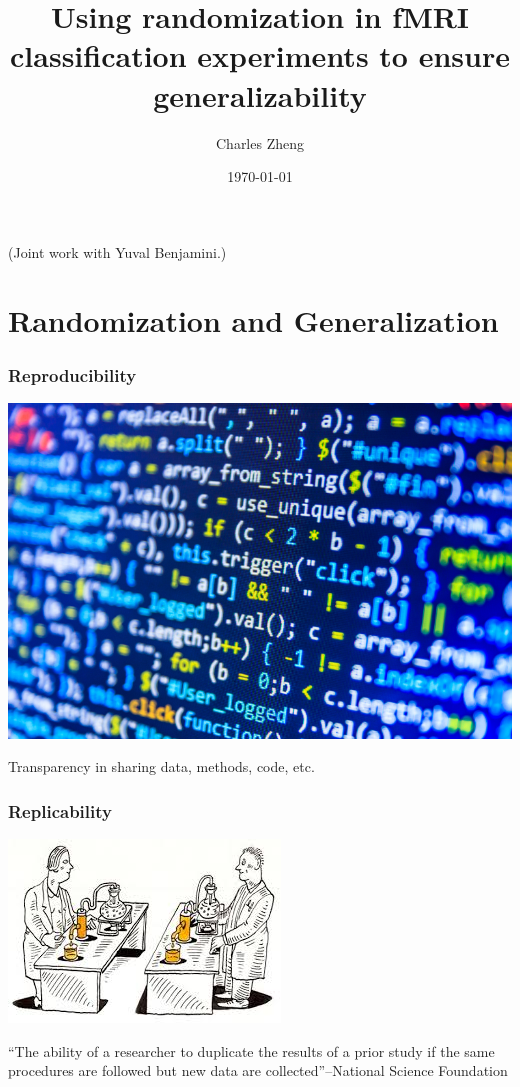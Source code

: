 \documentclass{beamer}
\title[tfMRI generalizability]{Using randomization in fMRI classification experiments to ensure generalizability}
\author{Charles Zheng} %
\institute[Stanford] %
{Stanford University}
\date{\today} %
\begin{document}
\begin{frame}
\titlepage %
(Joint work with Yuval Benjamini.)
\end{frame}

\section{Randomization and Generalization}

\begin{frame}
\frametitle{Reproducibility}
\begin{center}
\includegraphics[scale = 0.8]{code_clipart.jpg}
\end{center}
Transparency in sharing data, methods, code, etc.
\end{frame}

\begin{frame}
\frametitle{Replicability}
\begin{center}
\includegraphics[scale = 0.7]{replicability.jpg} 
\end{center}
``The ability of a researcher to duplicate the results of a prior
study if the same procedures are followed but new data are
collected''--National Science Foundation
\end{frame}
\end{document}
